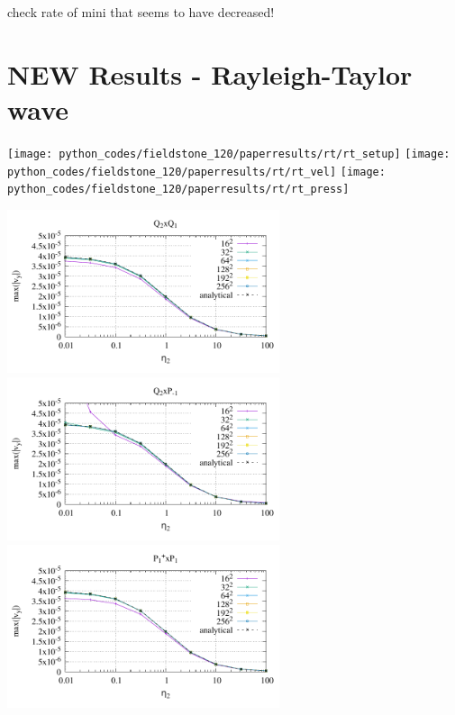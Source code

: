 check rate of mini that seems to have decreased!

\newpage
\section*{NEW Results - Rayleigh-Taylor wave}

\begin{center}
\texttt{[image: python\_codes/fieldstone\_120/paperresults/rt/rt\_setup]}
\texttt{[image: python\_codes/fieldstone\_120/paperresults/rt/rt\_vel]}
\texttt{[image: python\_codes/fieldstone\_120/paperresults/rt/rt\_press]}
\end{center}

\begin{center}
\includegraphics[width=8cm]{python_codes/fieldstone_120/paperresults/rt/structured/rt_wave_vel_Q2Q1.pdf}
\includegraphics[width=8cm]{python_codes/fieldstone_120/paperresults/rt/structured/rt_wave_vel_Q2Pm1.pdf}\\
\includegraphics[width=8cm]{python_codes/fieldstone_120/paperresults/rt/structured/rt_wave_vel_P1+P1.pdf}

\end{center}
